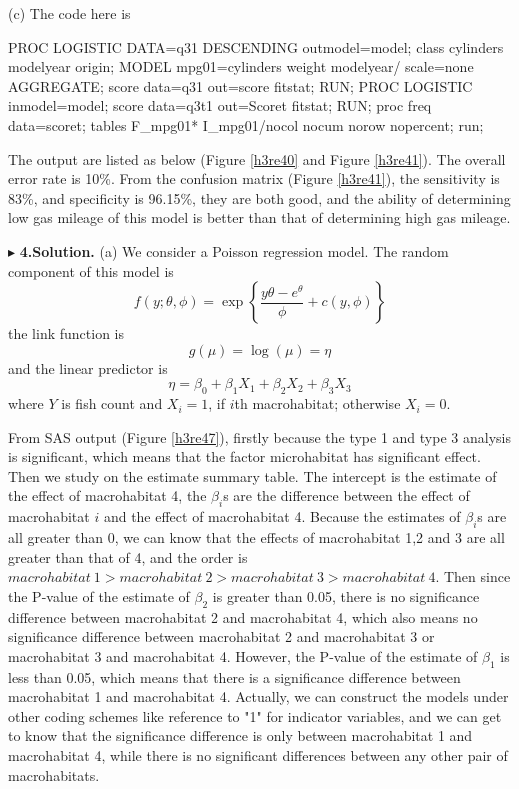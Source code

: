 \documentclass[letterpaper, 12pt]{article}
\begin{document}
(c) The code here is 
\begin{Sascode}[store=class]
PROC LOGISTIC DATA=q31 DESCENDING outmodel=model;
class cylinders modelyear origin;
MODEL mpg01=cylinders weight modelyear/ scale=none AGGREGATE;
score data=q31 out=score fitstat;
RUN;
PROC LOGISTIC inmodel=model;
score data=q3t1 out=Scoret fitstat;
RUN;
proc freq data=scoret;
tables F_mpg01* I_mpg01/nocol nocum norow nopercent;
run;
\end{Sascode}

The output are listed as below (Figure \ref{h3re40} and Figure \ref{h3re41}). The overall error rate is 10\%. From the confusion matrix (Figure \ref{h3re41}), the sensitivity is 83\%, and specificity is 96.15\%, they are both good, and the ability of determining low gas mileage of this model is better than that of determining high gas mileage.



$\blacktriangleright$ \textbf{4.\quad Solution.} 
(a) We consider a Poisson regression model. The random component of this model is 
$$
f(y;\theta,\phi)=\exp\left\{\frac{y\theta-e^\theta}{\phi}+c(y,\phi)\right\}
$$
the link function is 
$$
g(\mu)=\log(\mu)=\eta
$$
and the linear predictor is
$$
\eta=\beta_0+\beta_1X_1+\beta_2X_2+\beta_3X_3
$$
where $Y$ is fish count and $X_{i}=1$, if $i$th macrohabitat; otherwise $X_{i}=0$. 

From SAS output (Figure \ref{h3re47}), firstly because the type 1 and type 3 analysis is significant, which means that the factor microhabitat has significant effect. Then we study on the estimate summary table. The intercept is the estimate of the effect of macrohabitat 4, the $\beta_i$s are the difference between the effect of macrohabitat $i$ and the effect of macrohabitat 4. Because the estimates of $\beta_i$s are all greater than 0, we can know that the effects of macrohabitat 1,2 and 3 are all greater than that of 4, and the order is $macrohabitat ~1>macrohabitat ~2>macrohabitat ~3>macrohabitat ~4$. Then since the P-value of the estimate of $\beta_2$ is greater than 0.05, there is no significance difference between macrohabitat 2 and macrohabitat 4, which also means no significance difference between macrohabitat 2 and macrohabitat 3 or macrohabitat 3 and macrohabitat 4. However, the P-value of the estimate of $\beta_1$ is less than 0.05, which means that there is a significance difference between macrohabitat 1 and macrohabitat 4. Actually, we can construct the models under other coding schemes like reference to "1" for indicator variables, and we can get to know that the significance difference is only between macrohabitat 1 and macrohabitat 4, while there is no significant differences between any other pair of macrohabitats.
\end{document}
